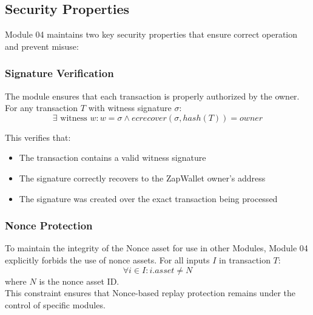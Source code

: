 \subsection{Security Properties}
Module 04 maintains two key security properties that ensure correct operation and prevent misuse:

\subsubsection{Signature Verification}
The module ensures that each transaction is properly authorized by the owner. For any transaction $T$ with witness signature $\sigma$:
\[ \exists \text{ witness } w : w = \sigma \land ecrecover(\sigma, hash(T)) = owner \]

This verifies that:
\begin{itemize}
   \item The transaction contains a valid witness signature
   \item The signature correctly recovers to the ZapWallet owner's address
   \item The signature was created over the exact transaction being processed
\end{itemize}

\subsubsection{Nonce Protection}
To maintain the integrity of the Nonce asset for use in other Modules, Module 04 explicitly forbids the use
of nonce assets. For all inputs $I$ in transaction $T$:
\[ \forall i \in I : i.asset \neq N \]
where $N$ is the nonce asset ID.\\

This constraint ensures that Nonce-based replay protection remains under the control of specific modules.




